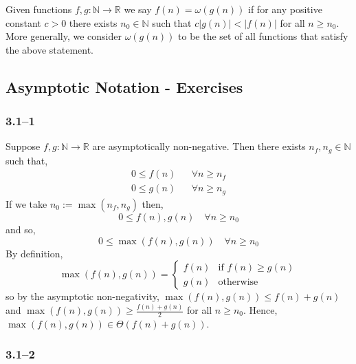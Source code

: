 \begin{definition}
	\label{def:little-omega}
	Given functions $f,g:\mathbb{N}\to\mathbb{R}$ we say $f(n)=\omega(g(n))$ if for any positive constant $c>0$ there exists $n_{0}\in\mathbb{N}$ such that $c\left|g(n)\right|<\left|f(n)\right|$ for all $n\geq n_{0}$. More generally, we consider $\omega(g(n))$ to be the set of all functions that satisfy the above statement.
\end{definition}

\subsection{Asymptotic Notation - Exercises}

\subsubsection*{3.1--1}

Suppose $f,g:\mathbb{N}\to\mathbb{R}$ are asymptotically non-negative. Then there exists $n_{f}, n_{g}\in\mathbb{N}$ such that,
\begin{equation*}
	\begin{aligned}
		0 \leq f(n)& &\forall n\geq n_{f}\\
		0 \leq g(n)& &\forall n\geq n_{g}
	\end{aligned}
\end{equation*}
If we take $n_{0}:=\max(n_{f}, n_{g})$ then,
\begin{equation*}
	0\leq f(n), g(n) \quad \forall n\geq n_{0}
\end{equation*}
and so,
\begin{equation*}
	0 \leq \max(f(n), g(n)) \quad \forall n\geq n_{0}
\end{equation*}
By definition,
\begin{equation*}
	\max(f(n),g(n)) =
	\begin{cases}
		f(n) & \text{if }f(n)\geq g(n)\\
		g(n) & \text{otherwise}
	\end{cases}
\end{equation*}
so by the asymptotic non-negativity, $\max(f(n), g(n))\leq f(n) + g(n)$ and $\max(f(n), g(n))\geq \frac{f(n)+g(n)}{2}$ for all $n\geq n_{0}$. Hence, $\max(f(n), g(n))\in\Theta(f(n)+g(n))$.

\subsubsection*{3.1--2}

